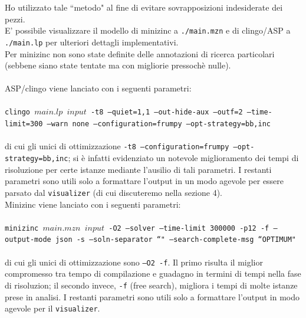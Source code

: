 \documentclass{article}
\begin{document}
Ho utilizzato tale ``metodo" al fine di evitare sovrapposizioni indesiderate dei pezzi. \\
E' possibile visualizzare il modello di minizinc a \texttt{./main.mzn} e di clingo/ASP a \texttt{./main.lp} per ulteriori dettagli implementativi.\\
Per minizinc non sono state definite delle annotazioni di ricerca particolari (sebbene siano state tentate ma con migliorie pressochè nulle).\\\\
ASP/clingo viene lanciato con i seguenti parametri:\\\\
\hspace*{.5cm}\texttt{clingo $main.lp$ $input$ -t8 --quiet=1,1 --out-hide-aux --outf=2 --time-limit=300 --warn none --configuration=frumpy --opt-strategy=bb,inc}\\\\
di cui gli unici di ottimizzazione \texttt{-t8 --configuration=frumpy --opt-strategy=bb,inc}; si è infatti evidenziato un notevole miglioramento dei tempi di risoluzione per certe istanze mediante l'ausilio di tali parametri. I restanti parametri sono utili solo a formattare l'output in un modo agevole per essere parsato dal \texttt{visualizer} (di cui discuteremo nella sezione 4).\\
Minizinc viene lanciato con i seguenti parametri:\\\\
\hspace*{.5cm}\texttt{minizinc $main.mzn$ $input$ -O2 --solver {} --time-limit 300000 -p12 -f --output-mode json -s --soln-separator ``" --search-complete-msg ``OPTIMUM"}\\\\
di cui gli unici di ottimizzazione sono \texttt{--O2 -f}. Il primo risulta il miglior compromesso tra tempo di compilazione e guadagno in termini di tempi nella fase di risoluzion; il secondo invece, \texttt{-f} (free search), migliora i tempi di molte istanze prese in analisi. I restanti parametri sono utili solo a formattare l'output in modo agevole per il \texttt{visualizer}.
\end{document}
